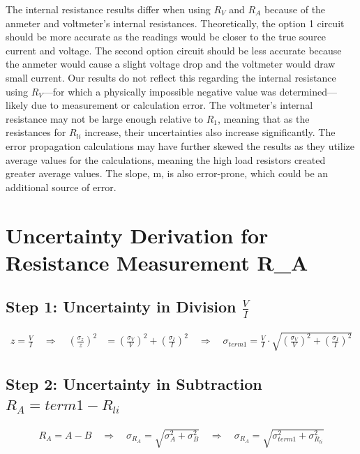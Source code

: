 \documentclass{article} %
\begin{document}
The internal resistance results differ when using $R_{V}$ and $R_{A}$ because of the anmeter and voltmeter's internal resistances. Theoretically, the option 1 circuit should be more accurate as the readings would be closer to the true source current and voltage. The second option circuit should be less accurate because the anmeter would cause a slight voltage drop and the voltmeter would draw small current. Our results do not reflect this regarding the internal resistance using $R_{V}$—for which a physically impossible negative value was determined—likely due to measurement or calculation error. The voltmeter's internal resistance may not be large enough relative to $R_{1}$, meaning that as the resistances for $R_{li}$ increase, their uncertainties also increase significantly. The error propagation calculations may have further skewed the results as they utilize average values for the calculations, meaning the high load resistors created greater average values. The slope, m, is also error-prone, which could be an additional source of error.  

\label{last_page}

\newpage
% 
% 

\appendix

\section{Uncertainty Derivation for Resistance Measurement R\_A}
\label{app:a_RA_uncertainty}

\subsection*{Step 1: Uncertainty in Division $\frac{V}{I}$}
\begin{align*}
z = \frac{V}{I} \quad \Rightarrow \quad \left(\frac{\sigma_z}{z}\right)^2 &= \left(\frac{\sigma_V}{V}\right)^2 + \left(\frac{\sigma_I}{I}\right)^2 \quad \Rightarrow \quad \sigma_{term1} = \frac{V}{I} \cdot \sqrt{\left(\frac{\sigma_V}{V}\right)^2 + \left(\frac{\sigma_I}{I}\right)^2}
\end{align*}

\subsection*{Step 2: Uncertainty in Subtraction $R_A = term1 - R_{li}$}
\begin{align*}
R_A = A - B \quad \Rightarrow \quad \sigma_{R_A} = \sqrt{\sigma_A^2 + \sigma_B^2} \quad \Rightarrow \quad \sigma_{R_A} = \sqrt{\sigma_{term1}^2 + \sigma_{R_{li}}^2}
\end{align*}
\end{document}
